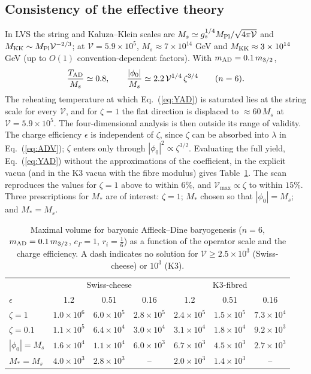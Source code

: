 \documentclass[11pt]{article}
\newcommand{\Mpl}{M_{\rm Pl}}
\newcommand{\vol}{\mathcal{V}}
\begin{document}
\subsection{Consistency of the effective theory}\label{sec:eft}
In LVS the string and Kaluza--Klein scales are $M_s\simeq g_s^{1/4}\Mpl/\sqrt{4\pi\vol}$ and $M_{\rm KK}\sim\Mpl\vol^{-2/3}$; at $\vol=5.9\times10^5$, $M_s\approx7\times10^{14}$ GeV and $M_{\rm KK}\approx3\times10^{14}$ GeV (up to $O(1)$ convention-dependent factors). With $m_{\rm AD}=0.1\,m_{3/2}$,
\begin{equation}
\frac{T_{\rm AD}}{M_s}\simeq0.8,\qquad
\frac{|\phi_0|}{M_s}\simeq2.2\,\vol^{1/4}\,\zeta^{3/4}\qquad(n=6).
\end{equation}
The reheating temperature at which Eq.~(\ref{eq:YAD}) is saturated lies at the string scale for every $\vol$, and for $\zeta=1$ the flat direction is displaced to $\approx60\,M_s$ at $\vol=5.9\times10^5$. The four-dimensional analysis is then outside its range of validity. The charge efficiency $\epsilon$ is independent of $\zeta$, since $\zeta$ can be absorbed into $\lambda$ in Eq.~(\ref{eq:ADV}); $\zeta$ enters only through $|\phi_0|^2\propto\zeta^{3/2}$. Evaluating the full yield, Eq.~(\ref{eq:YAD}) without the approximations of the coefficient, in the explicit vacua (and in the K3 vacua with the fibre modulus) gives Table~\ref{tab:adzeta}. The scan reproduces the values for $\zeta=1$ above to within $6\%$, and $\vol_{\max}\propto\zeta$ to within $15\%$. Three prescriptions for $M_*$ are of interest: $\zeta=1$; $M_*$ chosen so that $|\phi_0|=M_s$; and $M_*=M_s$.

\begin{table}[h]\centering\small\setlength{\tabcolsep}{4pt}
\begin{tabular}{lcccccc}\toprule
 & \multicolumn{3}{c}{Swiss-cheese} & \multicolumn{3}{c}{K3-fibred}\\
$\epsilon$ & 1.2 & 0.51 & 0.16 & 1.2 & 0.51 & 0.16\\ \midrule
$\zeta=1$ & $1.0\times10^6$ & $6.0\times10^5$ & $2.8\times10^5$ & $2.4\times10^5$ & $1.5\times10^5$ & $7.3\times10^4$\\
$\zeta=0.1$ & $1.1\times10^5$ & $6.4\times10^4$ & $3.0\times10^4$ & $3.1\times10^4$ & $1.8\times10^4$ & $9.2\times10^3$\\
$|\phi_0|=M_s$ & $1.6\times10^4$ & $1.1\times10^4$ & $6.0\times10^3$ & $6.7\times10^3$ & $4.5\times10^3$ & $2.7\times10^3$\\
$M_*=M_s$ & $4.0\times10^3$ & $2.8\times10^3$ & -- & $2.0\times10^3$ & $1.4\times10^3$ & --\\ \bottomrule
\end{tabular}
\caption{Maximal volume for baryonic Affleck--Dine baryogenesis ($n=6$, $m_{\rm AD}=0.1\,m_{3/2}$, $c_\Gamma=1$, $r_i=\tfrac16$) as a function of the operator scale and the charge efficiency. A dash indicates no solution for $\vol\ge2.5\times10^3$ (Swiss-cheese) or $10^3$ (K3).}\label{tab:adzeta}\end{table}
\end{document}
